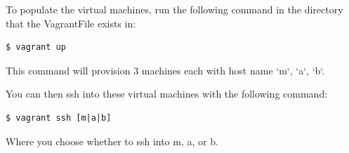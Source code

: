 \documentclass[12pt]{article}
\begin{document}
To populate the virtual machines, run the following command in the directory that the VagrantFile exists in:

\begin{verbatim}
$ vagrant up
\end{verbatim}
This command will provision 3 machines each with host name `m`, `a`, `b`.

You can then ssh into these virtual machines with the following command:
\begin{verbatim}
$ vagrant ssh [m|a|b]
\end{verbatim}
Where you choose whether to ssh into m, a, or b.
\end{document}
